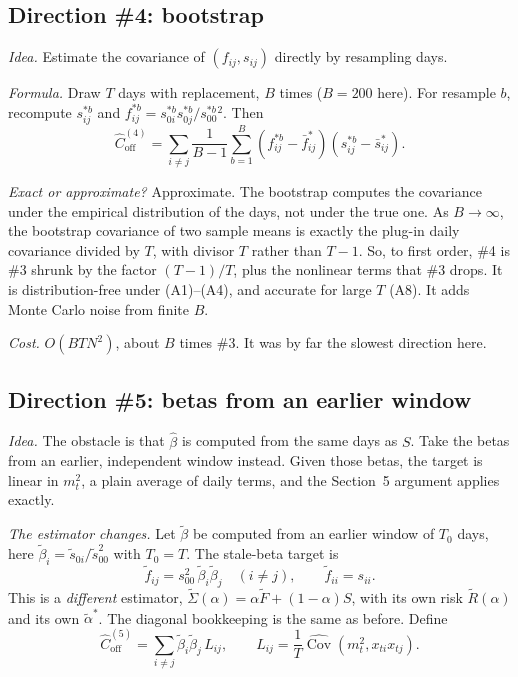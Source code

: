 \documentclass[11pt]{article}
\theoremstyle{remark}
\begin{document}
\subsection{Direction \#4: bootstrap}

\emph{Idea.} Estimate the covariance of $(f_{ij}, s_{ij})$ directly by resampling days.

\emph{Formula.} Draw $T$ days with replacement, $B$ times ($B = 200$ here). For resample $b$, recompute $s^{*b}_{ij}$ and $f^{*b}_{ij} = s^{*b}_{0i}s^{*b}_{0j}/s^{*b}_{00}{}^2$. Then
\[
  \hat C_{\mathrm{off}}^{(4)} = \sum_{i \ne j}\frac{1}{B-1}\sum_{b=1}^B\left(f^{*b}_{ij} - \bar f^{*}_{ij}\right)\left(s^{*b}_{ij} - \bar s^{*}_{ij}\right).
\]

\emph{Exact or approximate?} Approximate. The bootstrap computes the covariance under the empirical distribution of the days, not under the true one. As $B \to \infty$, the bootstrap covariance of two sample means is exactly the plug-in daily covariance divided by $T$, with divisor $T$ rather than $T-1$. So, to first order, \#4 is \#3 shrunk by the factor $(T-1)/T$, plus the nonlinear terms that \#3 drops. It is distribution-free under (A1)--(A4), and accurate for large $T$ (A8). It adds Monte Carlo noise from finite $B$.

\emph{Cost.} $O(BTN^2)$, about $B$ times \#3. It was by far the slowest direction here.

\subsection{Direction \#5: betas from an earlier window}

\emph{Idea.} The obstacle is that $\hat\beta$ is computed from the same days as $S$. Take the betas from an earlier, independent window instead. Given those betas, the target is linear in $m_t^2$, a plain average of daily terms, and the Section~5 argument applies exactly.

\emph{The estimator changes.} Let $\tilde\beta$ be computed from an earlier window of $T_0$ days, here $\tilde\beta_i = \tilde s_{0i}/\tilde s_{00}^2$ with $T_0 = T$. The stale-beta target is
\[
  \tilde f_{ij} = s_{00}^2\,\tilde\beta_i\tilde\beta_j \quad (i \ne j), \qquad \tilde f_{ii} = s_{ii}.
\]
This is a \emph{different} estimator, $\tilde\Sigma(\alpha) = \alpha\tilde F + (1-\alpha)S$, with its own risk $\tilde R(\alpha)$ and its own $\tilde\alpha^*$. The diagonal bookkeeping is the same as before. Define
\[
  \hat C^{(5)}_{\mathrm{off}} = \sum_{i \ne j}\tilde\beta_i\tilde\beta_j\,L_{ij}, \qquad L_{ij} = \frac{1}{T}\widehat{\operatorname{Cov}}(m_t^2, x_{ti}x_{tj}).
\]
\end{document}
